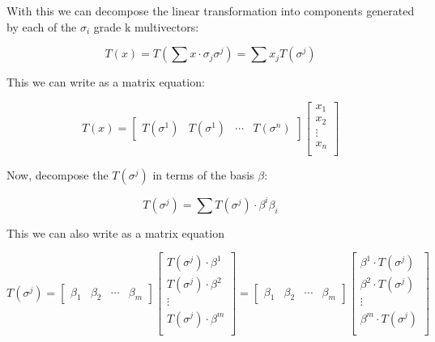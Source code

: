 With this we can decompose the linear transformation into components generated by each of the $\sigma_i$ grade k multivectors:

\begin{equation}
T(x) = T(\sum x \cdot \sigma_j \sigma^j) = \sum x_j T(\sigma^j)
\end{equation}

This we can write as a matrix equation:

\begin{equation}
T(x) = 
\begin{bmatrix}
T(\sigma^1) & T(\sigma^1) & \cdots & T(\sigma^n)
\end{bmatrix}
\begin{bmatrix}
x_1 \\
x_2 \\
\vdots \\
x_n \\
\end{bmatrix}
\end{equation}

Now, decompose the $T(\sigma^j)$ in terms of the basis $\beta$:

\begin{equation}
T(\sigma^j) = \sum T(\sigma^j) \cdot \beta^i \beta_i
\end{equation}

This we can also write as a matrix equation

\begin{equation}
T(\sigma^j) = 
\begin{bmatrix}
\beta_1 & \beta_2 & \cdots & \beta_m
\end{bmatrix}
\begin{bmatrix}
T(\sigma^j) \cdot \beta^1 \\
T(\sigma^j) \cdot \beta^2 \\
\vdots \\
T(\sigma^j) \cdot \beta^m \\
\end{bmatrix}
=
\begin{bmatrix}
\beta_1 & \beta_2 & \cdots & \beta_m
\end{bmatrix}
\begin{bmatrix}
\beta^1 \cdot T(\sigma^j) \\
\beta^2 \cdot T(\sigma^j) \\
\vdots \\
\beta^m \cdot T(\sigma^j) \\
\end{bmatrix}
\end{equation}

